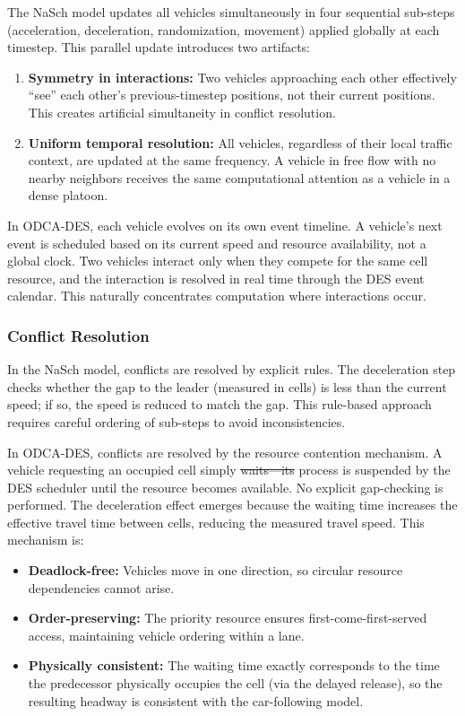 \documentclass[review,authoryear]{elsarticle}
\providecommand{\DIFaddtex}[1]{{\protect\color{blue}\uwave{#1}}} %
\providecommand{\DIFdeltex}[1]{{\protect\color{red}\sout{#1}}}                      %
\providecommand{\DIFaddbegin}{} %
\providecommand{\DIFaddend}{} %
\providecommand{\DIFdelbegin}{} %
\providecommand{\DIFdelend}{} %
\providecommand{\DIFadd}[1]{\texorpdfstring{\DIFaddtex{#1}}{#1}} %
\providecommand{\DIFdel}[1]{\texorpdfstring{\DIFdeltex{#1}}{}} %
\newcommand{\DIFscaledelfig}{0.5}
\newlength{\DIFdelgraphicswidth} %
\newlength{\DIFdelgraphicsheight} %
\newcommand{\DIFaddincludegraphics}[2][]{{\color{blue}\fbox{\DIFOincludegraphics[#1]{#2}}}} %
\newcommand{\DIFdelincludegraphics}[2][]{%
\sbox{\DIFdelgraphicsbox}{\DIFOincludegraphics[#1]{#2}}%
\settoboxwidth{\DIFdelgraphicswidth}{\DIFdelgraphicsbox} %
\settoboxtotalheight{\DIFdelgraphicsheight}{\DIFdelgraphicsbox} %
\scalebox{\DIFscaledelfig}{%
\parbox[b]{\DIFdelgraphicswidth}{\usebox{\DIFdelgraphicsbox}\\[-\baselineskip] \rule{\DIFdelgraphicswidth}{0em}}\llap{\resizebox{\DIFdelgraphicswidth}{\DIFdelgraphicsheight}{%
\setlength{\unitlength}{\DIFdelgraphicswidth}%
\begin{picture}(1,1)%
\thicklines\linethickness{2pt} %
{\color[rgb]{1,0,0}\put(0,0){\framebox(1,1){}}}%
{\color[rgb]{1,0,0}\put(0,0){\line( 1,1){1}}}%
{\color[rgb]{1,0,0}\put(0,1){\line(1,-1){1}}}%
\end{picture}%
}\hspace*{3pt}}} %
} %
\DeclareRobustCommand{\DIFaddbegin}{\DIFOaddbegin \let\includegraphics\DIFaddincludegraphics} %
\DeclareRobustCommand{\DIFaddend}{\DIFOaddend \let\includegraphics\DIFOincludegraphics} %
\DeclareRobustCommand{\DIFdelbegin}{\DIFOdelbegin \let\includegraphics\DIFdelincludegraphics} %
\DeclareRobustCommand{\DIFdelend}{\DIFOaddend \let\includegraphics\DIFOincludegraphics} %
\begin{document}
The NaSch model updates all vehicles simultaneously in four sequential sub-steps (acceleration, deceleration, randomization, movement) applied globally at each timestep. This parallel update introduces two artifacts:
\begin{enumerate}
    \item \textbf{Symmetry in interactions:} Two vehicles approaching each other effectively ``see'' each other's previous-timestep positions, not their current positions. This creates artificial simultaneity in conflict resolution.
    \item \textbf{Uniform temporal resolution:} All vehicles, regardless of their local traffic context, are updated at the same frequency. A vehicle in free flow with no nearby neighbors receives the same computational attention as a vehicle in a dense platoon.
\end{enumerate}

In ODCA-DES, each vehicle evolves on its own event timeline. A vehicle's next event is scheduled based on its current speed and resource availability, not a global clock. Two vehicles interact only when they compete for the same cell resource, and the interaction is resolved in real time through the DES event calendar. This naturally concentrates computation where interactions occur.

\subsubsection{Conflict Resolution}

In the NaSch model, conflicts are resolved by explicit rules. The deceleration step checks whether the gap to the leader (measured in cells) is less than the current speed; if so, the speed is reduced to match the gap. This rule-based approach requires careful ordering of sub-steps to avoid inconsistencies.

In ODCA-DES, conflicts are resolved by the resource contention mechanism. A vehicle requesting an occupied cell simply \DIFdelbegin \DIFdel{waits---its }\DIFdelend \DIFaddbegin \DIFadd{waits: its }\DIFaddend process is suspended by the DES scheduler until the resource becomes available. No explicit gap-checking is performed. The deceleration effect emerges because the waiting time increases the effective travel time between cells, reducing the measured travel speed. This mechanism is:
\begin{itemize}
    \item \textbf{Deadlock-free:} Vehicles move in one direction, so circular resource dependencies cannot arise.
    \item \textbf{Order-preserving:} The priority resource ensures first-come-first-served access, maintaining vehicle ordering within a lane.
    \item \textbf{Physically consistent:} The waiting time exactly corresponds to the time the predecessor physically occupies the cell (via the delayed release), so the resulting headway is consistent with the car-following model.
\end{itemize}
\end{document}
